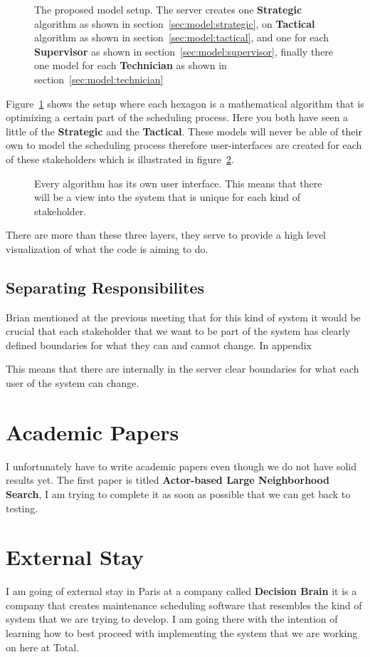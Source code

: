 \begin{figure}[H]
	\centering
    \drawModelSetupHexagon[userinterface=false, persistence=false, metaheuristics=true]
	\caption{The proposed model setup. The server creates one \textbf{Strategic} algorithm as shown in section~\ref{sec:model:strategic}, 
	on \textbf{Tactical} algorithm as shown in section~\ref{sec:model:tactical}, and 
	one for each \textbf{Supervisor} as shown in section~\ref{sec:model:supervisor}, 
	finally there one model for each \textbf{Technician} as shown in section~\ref{sec:model:technician}}
	\label{fig:hexagon:metaheuristics}
\end{figure}
Figure~\ref{fig:hexagon:metaheuristics} 
shows the setup where each hexagon is a mathematical algorithm that is optimizing
a certain part of the scheduling process. Here you both have seen a little of the \textbf{Strategic}
and the \textbf{Tactical}. These models will never be able of their own to model the scheduling process therefore user-interfaces are 
created for each of these stakeholders which is illustrated in figure~\ref{fig:hexagon:userinterfaces}.

\begin{figure}[H]
	\centering
    \drawModelSetupHexagon[userinterface=true, persistence=false, metaheuristics=false]
	\caption{Every algorithm has its own user interface. This means that there will be a view into the system that is 
	unique for each kind of stakeholder.}
	\label{fig:hexagon:userinterfaces}
\end{figure}

There are more than these three layers, they serve to provide a high level visualization of what the code is aiming to do.

\subsection{Separating Responsibilites}
Brian mentioned at the previous meeting that for this kind of system it would be crucial that
each stakeholder that we want to be part of the system has clearly defined boundaries for what
they can and cannot change. In appendix \

 This means that there are internally
in the server clear boundaries for what each user of the system can change.

\section{Academic Papers}
I unfortunately have to write academic papers even though we do not have solid results yet.
The first paper
is titled \textbf{Actor-based Large Neighborhood Search}, I am trying to complete it as 
soon as possible that we can get back to testing.

\section{External Stay}
I am going of external stay in Paris at a company called \textbf{Decision Brain} it is a 
company that creates maintenance scheduling software that resembles the kind of system 
that we are trying to develop. I am going there with the intention of learning how to
best proceed with implementing the system that we are working on here at Total.
